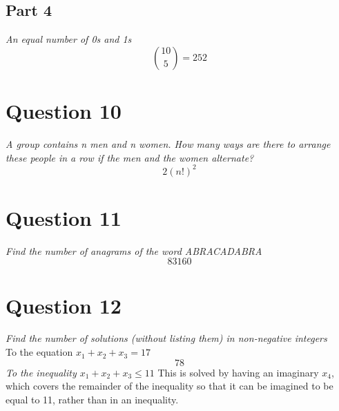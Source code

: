 \documentclass{article}[18pt]
\begin{document}
\subsection{Part 4}
\textit{An equal number of 0s and 1s}
$$\binom{10}{5}=252$$
\section{Question 10}
\textit{A group contains n men and n women. How many ways are there to arrange these people in a row if the men and the women alternate?}
$$2(n!)^2$$
\section{Question 11}
\textit{Find the number of anagrams of the word ABRACADABRA}
$$83160$$
\section{Question 12}
\textit{Find the number of solutions (without listing them) in non-negative integers}\\
To the equation $x_1+x_2+x_3=17$
$$78$$
\textit{To the inequality $x_1+x_2+x_3\leqslant11$}
This is solved by having an imaginary $x_4$, which covers the remainder of the inequality so that it can be imagined to be equal to 11, rather than in an inequality.
\end{document}
